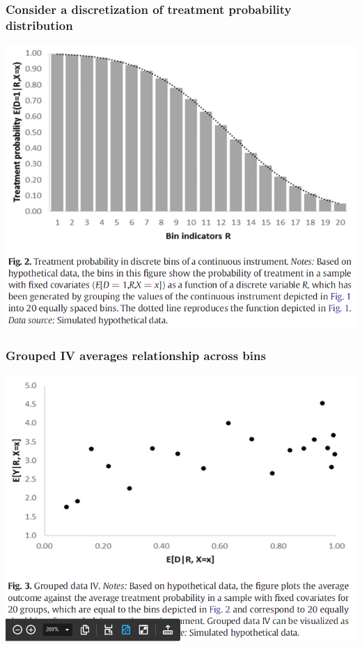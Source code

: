 \begin{frame}
  \frametitle{Consider a discretization of treatment probability distribution}
  \begin{center}
    \includegraphics[width=.9\textwidth]{./resources/CornelissenBins}
  \end{center}  
\end{frame}

\begin{frame}
  \frametitle{Grouped IV averages relationship across bins}
  \begin{center}
    \includegraphics[width=.9\textwidth]{./resources/CornelissenGrouped}
  \end{center}  
\end{frame}

